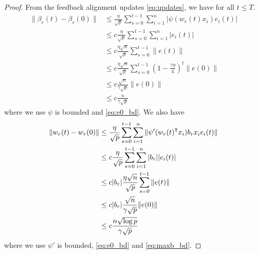 \begin{proof}
From the feedback alignment updates \eqref{eq:updates}, we have for all $t\leq T$.
\begin{equation*}
\begin{aligned}
    \|\beta_r(t)-\beta_r(0)\| &\leq \frac{\eta}{\sqrt p}\sum_{s=0}^{t-1}\sum_{i=1}^n |\psi(w_r(t)x_i)e_i(t)| \\
    &\leq c\frac{\eta}{\sqrt p}\sum_{s=0}^{t-1}\sum_{i=1}^n |e_i(t)| \\
    &\leq c\frac{\eta\sqrt n}{\sqrt p}\sum_{s=0}^{t-1} \|e(t)\| \\
    &\leq c\frac{\eta\sqrt n}{\sqrt p}\sum_{s=0}^{t-1}  (1-\frac{\gamma\eta}{4})^t\|e(0)\|  \\
    &\leq c\frac{\sqrt n}{\gamma\sqrt p}\|e(0)\| \\
    &\leq c\frac{n}{\gamma\sqrt p}
\end{aligned}
\end{equation*}
where we use $\psi$ is bounded and \eqref{eq:e0_bd}. We also have
\begin{equation*}
\begin{aligned}
    \|w_r(t)-w_r(0)\| &\leq \frac{\eta}{\sqrt p}\sum_{s=0}^{t-1}\sum_{i=1}^n \|\psi'(w_r(t)\transpose x_i)b_rx_i e_i(t)\| \\
    & \leq c\frac{\eta}{\sqrt p}\sum_{s=0}^{t-1}\sum_{i=1}^n |b_r| |e_i(t)| \\
    & \leq c|b_r|\frac{\eta\sqrt n}{\sqrt p}\sum_{s=0}^{t-1} \|e(t)\| \\
    & \leq c|b_r|\frac{\sqrt n}{\gamma\sqrt p}\|e(0)\| \\
    & \leq c\frac{n\sqrt{\log p}}{\gamma\sqrt p}
\end{aligned}
\end{equation*}
where we use $\psi'$ is bounded, \eqref{eq:e0_bd} and \eqref{eq:maxb_bd}.
\end{proof}

